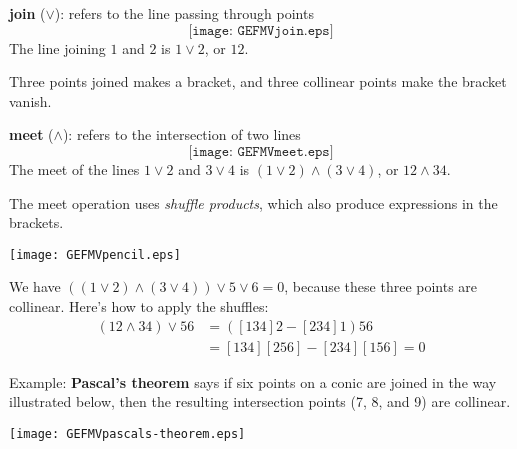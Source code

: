 \documentclass[%
	12pt]{beamer}
\theoremstyle{plain}
\theoremstyle{definition}
\begin{document}
\begin{frame}  
\textbf{join} ($\vee$): refers to the line passing through points
\[
\texttt{[image: GEFMVjoin.eps]}
\]
The line joining $1$ and $2$ is $1\vee 2$, or $12$.  

\pause
\vspace{1pc}
Three points joined makes a bracket, and three collinear points make the bracket vanish.
\end{frame}

\begin{frame}
\textbf{meet} ($\wedge$): refers to the intersection of two lines 
\[
\texttt{[image: GEFMVmeet.eps]}
\]
The meet of the lines $1\vee 2$ and $3\vee 4$ is $(1\vee 2)\wedge (3\vee 4)$, or $12\wedge 34$.

\pause 
\vspace{1pc}
The meet operation uses \emph{shuffle products}, which also produce expressions in the brackets.
\end{frame}

\begin{frame}{}{}
\begin{center}
\texttt{[image: GEFMVpencil.eps]}
\end{center}

We have $((1\vee 2)\wedge(3\vee 4))\vee 5\vee 6=0$, because these three points are collinear.  \pause Here's how to apply the shuffles: \pause
\begin{align*}
(12\wedge 34)\vee 56 &= ([134]2-[234]1)56 \\
 &= [134][256]-[234][156] = 0
\end{align*}
\end{frame}


\begin{frame}{}{}%
{\color{powCol}Example:} \textbf{Pascal's theorem} says if six points on a conic are joined in the way illustrated below, then the resulting intersection points (7, 8, and 9) are collinear.
\begin{center}
\texttt{[image: GEFMVpascals-theorem.eps]}
\end{center}
\end{frame}
\end{document}
